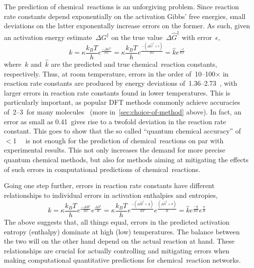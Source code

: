 The prediction of chemical~reactions is an unforgiving problem.
Since reaction rate constants depend exponentially on the activation Gibbs' free energies,
small deviations on the latter exponentally increase errors on the former.
As such,
given an activation energy estimate~$\Delta G^\ddagger$ on the true value~$\Delta \widehat{G}^\ddagger$ with error~$\epsilon$,
%
\begin{equation}
	k = \kappa \frac{k_B T}{h} e^\frac{- \Delta G^\ddagger}{R T}
	= \kappa \frac{k_B T}{h} e^\frac{- \left(\Delta \widehat{G}^\ddagger + \epsilon\right)}{R T}
	= \widehat{k} e^\frac{- \epsilon}{R T}
\end{equation}
%
where~$k$ and~$\widehat{k}$ are the predicted and true chemical~reaction constants,
respectively.
Thus,
at room temperature,
errors in the order of~10--100$\times$ in reaction rate constants are produced by energy deviations of~1.36--2.73~\kcalmol,
with larger errors in reaction rate constants found in lower temperatures.
This is particularly important,
as popular DFT methods commonly achieve accuracies of~2--3~\kcalmol for many molecules~\cite{Becke_2014,Bogojeski_2020} (more in~\cref{sec:choice-of-method} above).
In fact,
an error as small as 0.41~\kcalmol gives rise to a twofold deviation in the reaction rate constant.
This goes to show that the so called ``quantum chemical accuracy'' of $<$1~\kcalmol~\cite{Bogojeski_2020} is not enough for the prediction of chemical~reactions on par with experimental results.
This not only increases the demand for more precise quantum chemical methods,
but also for methods aiming at mitigating the effects of such errors in computational predictions of chemical~reactions.

Going one step further,
errors in reaction rate constants have different relationships to individual errors in activation enthalpies and entropies,
%
\begin{equation}
	k = \kappa \frac{k_B T}{h} e^\frac{- \Delta H^\ddagger}{R T}
	e^\frac{  \Delta S^\ddagger}{R}
	= \kappa \frac{k_B T}{h} e^\frac{- \left(\Delta \widehat{H}^\ddagger + \chi\right)}{R T}
	e^\frac{        \left(\Delta \widehat{S}^\ddagger + \sigma\right)}{R}
	= \widehat{k}
	e^\frac{- \chi}{R T}
	e^\frac{  \sigma}{R}
\end{equation}
%
The above suggests that,
all things equal,
errors in the predicted activation entropy (enthalpy) dominate at high (low) temperatures.
The balance between the two will on the other hand depend on the actual reaction at hand.
These relationships are crucial for actually controlling and mitigating errors when making computational quantitative predictions for chemical~reaction networks.

